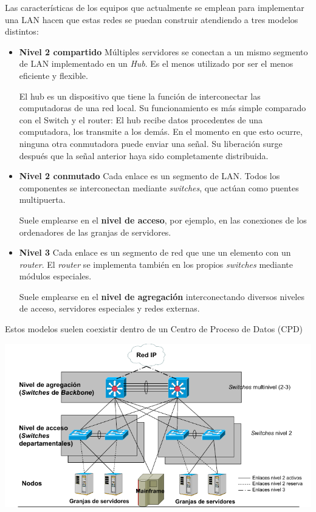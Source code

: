 Las características de los equipos que actualmente se emplean para implementar una LAN hacen que estas redes se puedan construir atendiendo a tres modelos distintos:
\begin{itemize}
\item \textbf{Nivel 2 compartido} Múltiples servidores se conectan a un mismo segmento de LAN implementado en un \textit{Hub}. Es el menos utilizado por ser el menos eficiente y flexible.

El hub es un dispositivo que tiene la función de interconectar las computadoras de una red local. Su funcionamiento es más simple comparado con el Switch y el router:
El hub recibe datos procedentes de una computadora, los transmite a los demás. En el momento en que esto ocurre, ninguna otra conmutadora puede enviar una señal. Su liberación surge después que la señal anterior haya sido completamente distribuida.


\item \textbf{Nivel 2 conmutado} Cada enlace es un segmento de LAN. Todos los componentes se interconectan mediante \textit{switches}, que actúan como puentes multipuerta.

Suele emplearse en el \textbf{nivel de acceso}, por ejemplo, en las conexiones de los ordenadores de las granjas de servidores.

\item \textbf{Nivel 3} Cada enlace es un segmento de red que une un elemento con un \textit{router}. El \textit{router} se implementa también en los propios \textit{switches} mediante módulos especiales.

Suele emplearse en el \textbf{nivel de agregación} interconectando diversos niveles de acceso, servidores especiales y redes externas.
\end{itemize}

Estos modelos suelen coexistir dentro de un Centro de Proceso de Datos (CPD)
\begin{center}
\includegraphics[width=\linewidth]{img/niveles.png}
\end{center}

